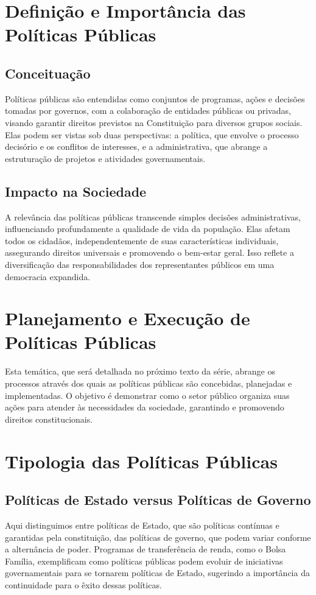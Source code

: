 \documentclass[
   article,       
   12pt,          
   oneside,       
   a4paper,       
   english,       
   brazil,        
   sumario=tradicional
   ]{abntex2}
\begin{document}
\section{Definição e Importância das Políticas Públicas}
    \subsection{Conceituação}
        Políticas públicas são entendidas como conjuntos de programas, ações e decisões tomadas por governos, com a colaboração de entidades públicas ou privadas, visando garantir direitos previstos na Constituição para diversos grupos sociais. Elas podem ser vistas sob duas perspectivas: a política, que envolve o processo decisório e os conflitos de interesses, e a administrativa, que abrange a estruturação de projetos e atividades governamentais.
    
    \subsection{Impacto na Sociedade}
        A relevância das políticas públicas transcende simples decisões administrativas, influenciando profundamente a qualidade de vida da população. Elas afetam todos os cidadãos, independentemente de suas características individuais, assegurando direitos universais e promovendo o bem-estar geral. Isso reflete a diversificação das responsabilidades dos representantes públicos em uma democracia expandida.

\section{Planejamento e Execução de Políticas Públicas}
    Esta temática, que será detalhada no próximo texto da série, abrange os processos através dos quais as políticas públicas são concebidas, planejadas e implementadas. O objetivo é demonstrar como o setor público organiza suas ações para atender às necessidades da sociedade, garantindo e promovendo direitos constitucionais.

\section{Tipologia das Políticas Públicas}
    \subsection{Políticas de Estado versus Políticas de Governo}
        Aqui distinguimos entre políticas de Estado, que são políticas contínuas e garantidas pela constituição, das políticas de governo, que podem variar conforme a alternância de poder. Programas de transferência de renda, como o Bolsa Família, exemplificam como políticas públicas podem evoluir de iniciativas governamentais para se tornarem políticas de Estado, sugerindo a importância da continuidade para o êxito dessas políticas.
\end{document}
